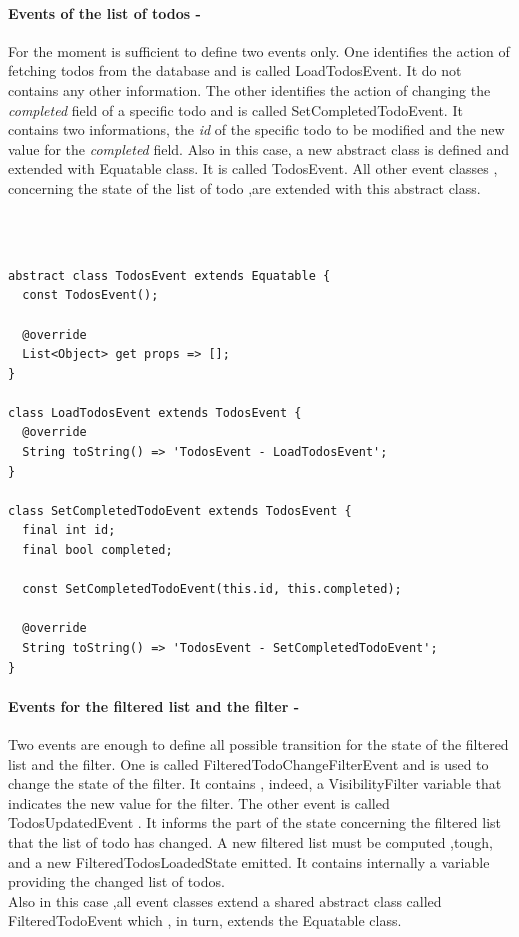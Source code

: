 \paragraph{Events of the list of todos - }
\label{subpar:todo_app_bloc_core_state}

For the moment is sufficient to define two events only. One identifies the action of fetching todos from the database and is called LoadTodosEvent. It do not contains any other information. The other identifies the action of changing the \textit{completed} field of a specific todo and is called SetCompletedTodoEvent. It contains two informations, the \textit{id} of the specific todo to be modified and the new value for the \textit{completed }field. 
Also in this case, a new abstract class is defined and extended with Equatable class. It is called TodosEvent. All other event classes , concerning the state of the list of todo ,are extended with this abstract class.
\begin{code}
\mbox{}\\
 \mbox{}
\label{code:2.14}
\begin{verbatim}

abstract class TodosEvent extends Equatable {
  const TodosEvent();

  @override
  List<Object> get props => [];
}

class LoadTodosEvent extends TodosEvent {
  @override
  String toString() => 'TodosEvent - LoadTodosEvent';
}

class SetCompletedTodoEvent extends TodosEvent {
  final int id;
  final bool completed;

  const SetCompletedTodoEvent(this.id, this.completed);

  @override
  String toString() => 'TodosEvent - SetCompletedTodoEvent';
}
\end{verbatim}
\mbox{}
\end{code}

\paragraph{Events for the filtered list and the filter - }
\label{subpar:todo_app_bloc_core_state}

Two events are enough to define all possible transition for the state of the filtered list and the filter. One is called FilteredTodoChangeFilterEvent and is used to change the state of the filter. It contains , indeed, a VisibilityFilter variable  that indicates the new value for the filter. The other event is called TodosUpdatedEvent . It informs the part of the state concerning the filtered list that the list of todo has changed. A new filtered list must be computed ,tough, and a new FilteredTodosLoadedState emitted. It contains internally a variable providing the changed list of todos.\\
Also in this case ,all event classes extend a shared abstract class called FilteredTodoEvent which , in turn, extends the Equatable class. 

